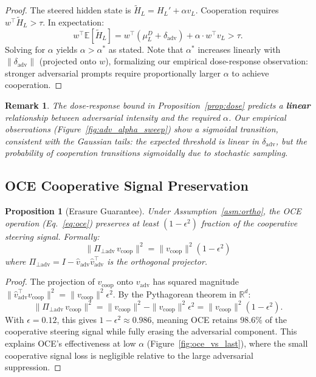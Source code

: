\documentclass{article}
\newtheorem{proposition}{Proposition}
\newtheorem{remark}{Remark}
\begin{document}
\begin{proof}
The steered hidden state is $\tilde{H}_L = H_L' + \alpha v_L$. Cooperation requires $w^\top \tilde{H}_L > \tau$. In expectation:
\[
w^\top \mathbb{E}[\tilde{H}_L] = w^\top(\mu_L^D + \delta_\text{adv}) + \alpha \cdot w^\top v_L > \tau.
\]
Solving for $\alpha$ yields $\alpha > \alpha^*$ as stated. Note that $\alpha^*$ increases linearly with $\|\delta_\text{adv}\|$ (projected onto $w$), formalizing our empirical dose-response observation: stronger adversarial prompts require proportionally larger $\alpha$ to achieve cooperation.
\end{proof}

\begin{remark}
The dose-response bound in Proposition~\ref{prop:dose} predicts a \textbf{linear} relationship between adversarial intensity and the required $\alpha$. Our empirical observations (Figure~\ref{fig:adv_alpha_sweep}) show a sigmoidal transition, consistent with the Gaussian tails: the \textit{expected} threshold is linear in $\delta_\text{adv}$, but the \textit{probability} of cooperation transitions sigmoidally due to stochastic sampling.
\end{remark}

\subsection{OCE Cooperative Signal Preservation}

\begin{proposition}[Erasure Guarantee]
\label{prop:oce}
Under Assumption~\ref{asm:ortho}, the OCE operation (Eq.~\ref{eq:oce}) preserves at least $(1 - \epsilon^2)$ fraction of the cooperative steering signal. Formally:
\[
\|\Pi_{\perp \text{adv}} \, v_\text{coop}\|^2 = \|v_\text{coop}\|^2 (1 - \epsilon^2)
\]
where $\Pi_{\perp \text{adv}} = I - \hat{v}_\text{adv} \hat{v}_\text{adv}^\top$ is the orthogonal projector.
\end{proposition}

\begin{proof}
The projection of $v_\text{coop}$ onto $v_\text{adv}$ has squared magnitude $\|\hat{v}_\text{adv}^\top v_\text{coop}\|^2 = \|v_\text{coop}\|^2 \epsilon^2$. By the Pythagorean theorem in $\mathbb{R}^d$:
\[
\|\Pi_{\perp \text{adv}} \, v_\text{coop}\|^2 = \|v_\text{coop}\|^2 - \|v_\text{coop}\|^2 \epsilon^2 = \|v_\text{coop}\|^2(1 - \epsilon^2).
\]
With $\epsilon = 0.12$, this gives $1 - \epsilon^2 \approx 0.986$, meaning OCE retains $98.6\%$ of the cooperative steering signal while fully erasing the adversarial component. This explains OCE's effectiveness at low $\alpha$ (Figure~\ref{fig:oce_vs_last}), where the small cooperative signal loss is negligible relative to the large adversarial suppression.
\end{proof}
\end{document}
